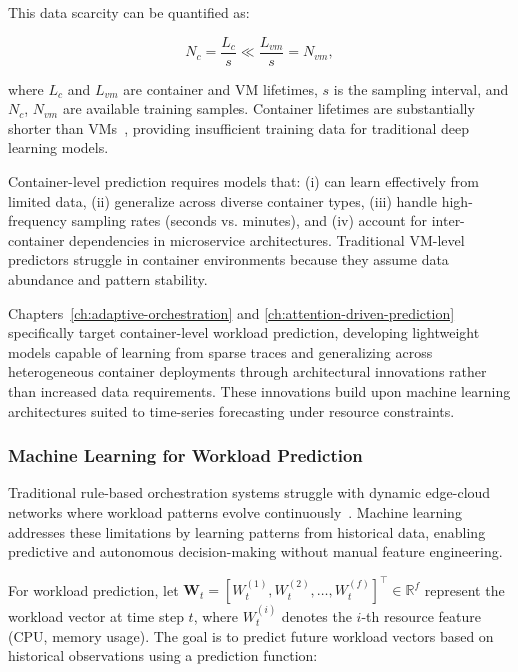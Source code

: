 This data scarcity can be quantified as:

\begin{equation}
N_c = \frac{L_c}{s} \ll \frac{L_{vm}}{s} = N_{vm},
\end{equation}

where $L_c$ and $L_{vm}$ are container and \ac{VM} lifetimes, $s$ is the sampling interval, and $N_c$, $N_{vm}$ are available training samples. Container lifetimes are substantially shorter than \acp{VM}~\cite{nadgowda2017voyager}, providing insufficient training data for traditional deep learning models.

Container-level prediction requires models that: (i) can learn effectively from limited data, (ii) generalize across diverse container types, (iii) handle high-frequency sampling rates (seconds vs. minutes), and (iv) account for inter-container dependencies in microservice architectures. Traditional \ac{VM}-level predictors struggle in container environments because they assume data abundance and pattern stability.

Chapters~\ref{ch:adaptive-orchestration} and \ref{ch:attention-driven-prediction} specifically target container-level workload prediction, developing lightweight models capable of learning from sparse traces and generalizing across heterogeneous container deployments through architectural innovations rather than increased data requirements. These innovations build upon machine learning architectures suited to time-series forecasting under resource constraints.

\subsubsection{Machine Learning for Workload Prediction}
\label{sec:ch2_ml_workload}

Traditional rule-based orchestration systems struggle with dynamic edge-cloud networks where workload patterns evolve continuously~\cite{chen2018auto}. Machine learning addresses these limitations by learning patterns from historical data, enabling predictive and autonomous decision-making without manual feature engineering.

For workload prediction, let $\mathbf{W}_t = [W_t^{(1)}, W_t^{(2)}, \ldots, W_t^{(f)}]^\top \in \mathbb{R}^f$ represent the workload vector at time step $t$, where $W_t^{(i)}$ denotes the $i$-th resource feature (\ac{CPU}, memory usage). The goal is to predict future workload vectors based on historical observations using a prediction function:

